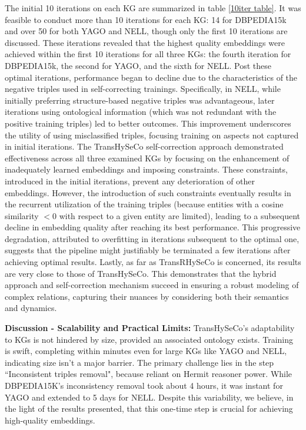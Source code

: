 \documentclass[sigconf]{acmart}
\newcommand{\TransHI}{TransHySeCo\xspace}
\begin{document}
The initial 10 iterations on each KG are summarized in table \ref{10iter table}. It was feasible to conduct more than 10 iterations for each KG: 14 for DBPEDIA15k and over 50 for both YAGO and NELL, though only the first 10 iterations are discussed. These iterations revealed that the highest quality embeddings were achieved within the first 10 iterations for all three KGs: the fourth iteration for DBPEDIA15k, the second for YAGO, and the sixth for NELL. Post these optimal iterations, performance began to decline due to the characteristics of the negative triples used in self-correcting trainings.
Specifically, in NELL, while initially preferring structure-based negative triples was advantageous, later iterations using ontological information (which was not redundant with the positive training triples) led to better outcomes. This improvement underscores the utility of using misclassified triples, focusing training on aspects not captured in initial iterations.
The \TransHI self-correction approach demonstrated effectiveness across all three examined KGs by focusing on the enhancement of inadequately learned embeddings and imposing constraints. These constraints, introduced in the initial iterations, prevent any deterioration of other embeddings. However, the introduction of such constraints eventually results in the recurrent utilization of the training triples (because entities with a cosine similarity $< 0$ with respect to a given entity are limited), leading to a subsequent decline in embedding quality after reaching its best performance. This progressive degradation, attributed to overfitting in iterations subsequent to the optimal one, suggests that the pipeline might justifiably be terminated a few iterations after achieving optimal results. 
Lastly, as far as TransRHySeCo is concerned, its results are very close to those of \TransHI. This demonstrates that the hybrid approach and self-correction mechanism succeed in ensuring a robust modeling of complex relations, capturing their nuances by considering both their semantics and dynamics.

\noindent \textbf{Discussion - Scalability and Practical Limits:} \TransHI's adaptability to KGs is not hindered by size, provided an associated ontology exists. Training is swift, completing within minutes even for large KGs like YAGO and NELL, indicating size isn't a major barrier. The primary challenge lies in the step ``Inconsistent triples removal", because reliant on Hermit reasoner power. While DBPEDIA15K's inconsistency removal took about 4 hours, it was instant for YAGO and extended to 5 days for NELL. Despite this variability, we believe, in the light of the results presented, that this one-time step is crucial for achieving high-quality embeddings.
\end{document}
